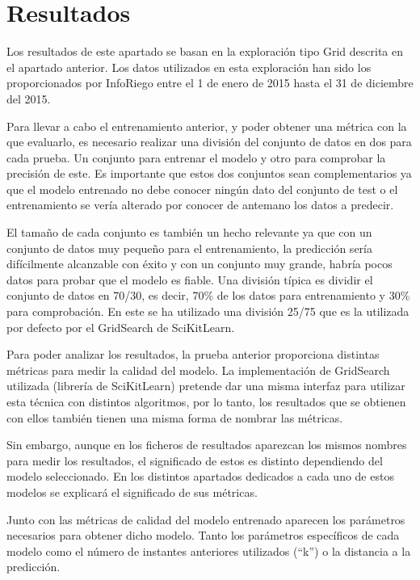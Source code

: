 \cleardoublepage

\chapter{Resultados}
\label{makereference7}

Los resultados de este apartado se basan en la exploración tipo Grid descrita en el apartado anterior. Los datos utilizados en esta exploración han sido los proporcionados por InfoRiego entre el 1 de enero de 2015 hasta el 31 de diciembre del 2015.

Para llevar a cabo el entrenamiento anterior, y poder obtener una métrica con la que evaluarlo, es necesario realizar una división del conjunto de datos en dos para cada prueba. Un conjunto para entrenar el modelo y otro para comprobar la precisión de este. Es importante que estos dos conjuntos sean complementarios ya que el modelo entrenado no debe conocer ningún dato del conjunto de test o el entrenamiento se vería alterado por conocer de antemano los datos a predecir.

El tamaño de cada conjunto es también un hecho relevante ya que con un conjunto de datos muy pequeño para el entrenamiento, la predicción sería difícilmente alcanzable con éxito y con un conjunto muy grande, habría pocos datos para probar que el modelo es fiable. Una división típica es dividir el conjunto de datos en 70/30, es decir, 70\% de los datos para entrenamiento y 30\% para comprobación. En este se ha utilizado una división 25/75 que es la utilizada por defecto por el GridSearch de SciKitLearn.

Para poder analizar los resultados, la prueba anterior proporciona distintas métricas para medir la calidad del modelo. La implementación de GridSearch utilizada (librería de SciKitLearn) pretende dar una misma interfaz para utilizar esta técnica con distintos algoritmos, por lo tanto, los resultados que se obtienen con ellos también tienen una misma forma de nombrar las métricas.

Sin embargo, aunque en los ficheros de resultados aparezcan los mismos nombres para medir los resultados, el significado de estos es distinto dependiendo del modelo seleccionado. En los distintos apartados dedicados a cada uno de estos modelos se explicará el significado de sus métricas.

Junto con las métricas de calidad del modelo entrenado aparecen los parámetros necesarios para obtener dicho modelo. Tanto los parámetros específicos de cada modelo como el número de instantes anteriores utilizados (``k'') o la distancia a la predicción.

